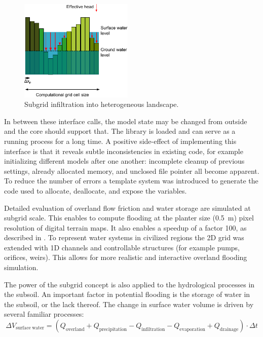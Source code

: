 \documentclass[a4paper]{article}
\begin{document}
\begin{figure}
  \vspace{-30pt}
  \centering
  \includegraphics[width=0.48\textwidth]{subgrid_hydrology}
  \caption{Subgrid infiltration into heterogeneous landscape.}
  \label{fig:figure2}
\end{figure}

In between these interface calls, the model state may be changed from outside and the core should support that. The library is loaded and can serve as a running process for a long time. A positive side-effect of implementing this interface is that it reveals subtle inconsistencies in existing code, for example initializing different models after one another: incomplete cleanup of previous settings, already allocated memory, and unclosed file pointer all become apparent. To reduce the number of errors a template system was introduced to generate the code used to allocate, deallocate, and expose the variables.

Detailed evaluation of overland flow friction and water storage are simulated at subgrid scale. This enables to compute flooding at the planter size (\SI{0.5}{\meter}) pixel resolution of digital terrain maps. It also enables a speedup of a factor 100, as described in \citet{Stelling2012}. To represent water systems in civilized regions the 2D grid was extended with 1D channels and controllable structures (for example pumps, orifices, weirs). This allows for more realistic and interactive overland flooding simulation.

The power of the subgrid concept is also applied to the hydrological processes in the subsoil. An important factor in potential flooding is the storage of water in the subsoil, or the lack thereof. The change in surface water volume is driven by several familiar processes:
\[
\Delta V_\mathrm{surface\ water} = (Q_\mathrm{overland} + Q_\mathrm{precipitation} - Q_\mathrm{infiltration} - Q_\mathrm{evaporation} + Q_\mathrm{drainage})\cdot\Delta t
\]
\end{document}
